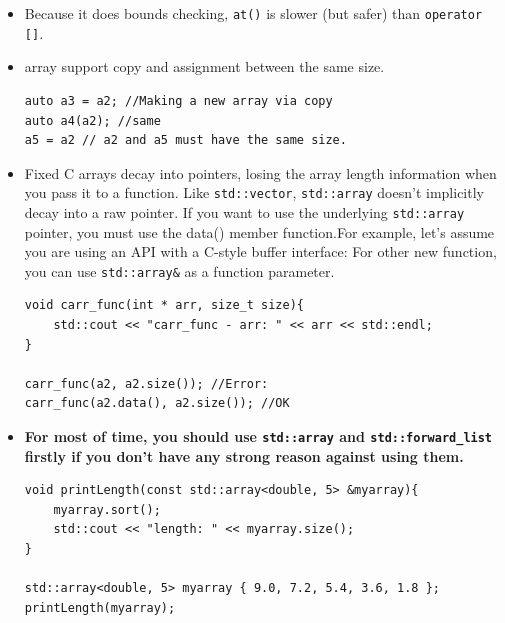 \documentclass[a4paper,11pt,twoside]{book}
\begin{document}
\begin{itemize}
    \item Because it does bounds checking, \texttt{at()} is slower (but safer) than \texttt{operator []}.

    \item array support copy and assignment between the same size.
\begin{lstlisting}[numbers=none]
auto a3 = a2; //Making a new array via copy
auto a4(a2); //same
a5 = a2 // a2 and a5 must have the same size.  
\end{lstlisting}


    \item Fixed C arrays decay into pointers, losing the array length information when you pass it to a function. Like \texttt{std::vector}, \texttt{std::array} doesn't implicitly decay into a raw pointer. If you want to use the underlying \texttt{std::array} pointer, you must use the data() member function.For example, let's assume you are using an API with a C-style buffer interface: For other new function, you can use \texttt{std::array\&} as a function parameter. 

\begin{lstlisting}[numbers=none]
void carr_func(int * arr, size_t size){
    std::cout << "carr_func - arr: " << arr << std::endl;
}

carr_func(a2, a2.size()); //Error:
carr_func(a2.data(), a2.size()); //OK
\end{lstlisting}

    \item \textbf{For most of time, you should use \texttt{std::array} and \texttt{std::forward\_list} firstly if you don't have any strong reason against using them.} 
\begin{lstlisting}[numbers=none]
void printLength(const std::array<double, 5> &myarray){
    myarray.sort();
    std::cout << "length: " << myarray.size();
}

std::array<double, 5> myarray { 9.0, 7.2, 5.4, 3.6, 1.8 };
printLength(myarray);
\end{lstlisting}

\end{itemize}
\end{document}
